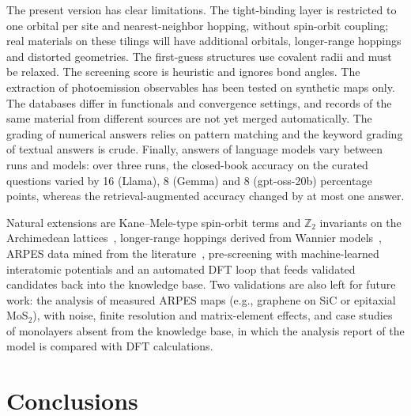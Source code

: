 \documentclass[prmaterials,twocolumn,superscriptaddress,longbibliography,nofootinbib]{revtex4-2}
\begin{document}
The present version has clear limitations. The tight-binding layer is restricted to one
orbital per site and nearest-neighbor hopping, without spin-orbit coupling; real materials
on these tilings will have additional orbitals, longer-range hoppings and distorted
geometries. The first-guess structures use covalent radii and must be relaxed. The screening
score is heuristic and ignores bond angles. The extraction of photoemission observables has
been tested on synthetic maps only. The databases differ in functionals and
convergence settings, and records of the same material from different sources are not yet
merged automatically. The grading of numerical answers relies on pattern matching and the
keyword grading of textual answers is crude. Finally, answers of language models vary
between runs and models: over three runs, the closed-book accuracy on the curated questions
varied by 16 (Llama), 8 (Gemma) and 8 (gpt-oss-20b) percentage points, whereas the
retrieval-augmented accuracy changed by at most one answer.

Natural extensions are Kane--Mele-type spin-orbit terms and $\mathbb Z_2$ invariants on the
Archimedean lattices~\cite{KaneMele2005,CrastoDeLima2019}, longer-range hoppings derived
from Wannier models~\cite{Liu2013TB}, ARPES data mined from the
literature~\cite{Shang2025}, pre-screening with machine-learned interatomic potentials and an
automated DFT loop that feeds validated candidates back into the knowledge base. Two
validations are also left for future work: the analysis of measured ARPES maps (e.g.,
graphene on SiC or epitaxial MoS$_2$), with noise, finite resolution and matrix-element
effects, and case studies of monolayers absent from the knowledge base, in which the
analysis report of the model is compared with DFT calculations.

\section{Conclusions}
\end{document}
